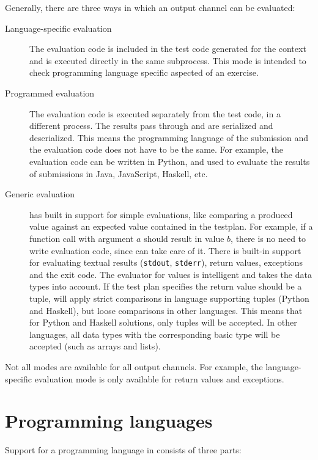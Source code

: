\begin{multicols}{2}
    Generally, there are three ways in which an output channel can be evaluated:
    \begin{description}
        \item[Language-specific evaluation] The evaluation code is included in the test code generated for the context and is executed directly in the same subprocess.
        This mode is intended to check programming language specific aspected of an exercise.
        \item[Programmed evaluation] The evaluation code is executed separately from the test code, in a different process.
        The results pass through \tested{} and are serialized and deserialized.
        This means the programming language of the submission and the evaluation code does not have to be the same.
        For example, the evaluation code can be written in Python, and used to evaluate the results of submissions in Java, JavaScript, Haskell, etc.
        \item[Generic evaluation] \tested{} has built in support for simple evaluations, like comparing a produced value against an expected value contained in the testplan.
        For example, if a function call with argument $a$ should result in value $b$, there is no need to write evaluation code, since \tested{} can take care of it.
        There is built-in support for evaluating textual results (\texttt{stdout}, \texttt{stderr}), return values, exceptions and the exit code.
        The evaluator for values is intelligent and takes the data types into account.
        If the test plan specifies the return value should be a tuple, \tested{} will apply strict comparisons in language supporting tuples (Python and Haskell), but loose comparisons in other languages.
        This means that for Python and Haskell solutions, only tuples will be accepted.
        In other languages, all data types with the corresponding basic type will be accepted (such as arrays and lists).
    \end{description}
    
    Not all modes are available for all output channels.
    For example, the language-specific evaluation mode is only available for return values and exceptions.
    
    \section{Programming languages}\label{sec:extend-programming-languages}
    
    Support for a programming language in \tested{} consists of three parts:
    

\end{multicols}
